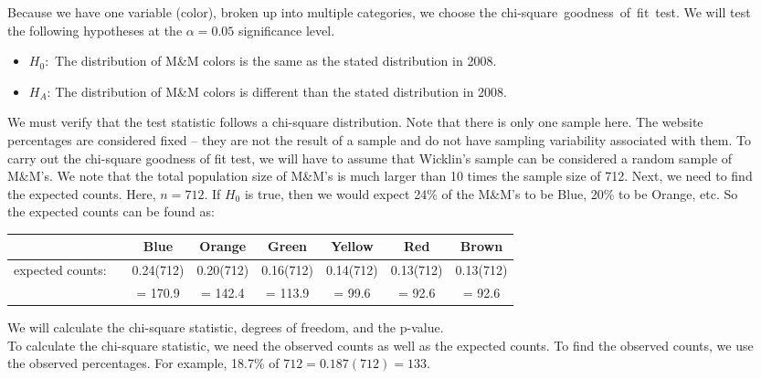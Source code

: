 \begin{examplewrap}
\begin{nexample}
\begin{description}
\item[]  
Because we have one variable (color), broken up into multiple categories, we choose the \mbox{chi-square goodness of fit test.} We will test the following hypotheses at the $\alpha=0.05$ significance level.
\begin{itemize}\vspace{-1mm}
\setlength{\itemsep}{0mm}
\item[] $H_0$:  \,The distribution of M\&M colors is the same as the stated distribution in 2008. 
\item[] $H_A$: The distribution of M\&M colors is different than the stated distribution in 2008.
 \end{itemize}
\item[]  We must verify that the test statistic follows a chi-square distribution.  Note that there is only one sample here.  The website percentages are considered fixed -- they are not the result of a sample and do not have sampling variability associated with them.  To carry out the chi-square goodness of fit test, we will have to assume that Wicklin's sample can be considered a random sample of M\&M's.  We note that the total population size of M\&M's is much larger than 10 times the sample size of 712.  Next, we need to find the expected counts.  Here, $n=712$.  If $H_0$ is true, then we would expect 24\% of the M\&M's to be Blue, 20\% to be Orange, etc.  So the expected counts can be found as:

\begin{small}
\begin{tabular}{ll ccc ccc}
\hline
	 & \hspace{1mm} & Blue & Orange & Green & Yellow & Red & Brown\\
\hline
expected counts:&		& 0.24(712) &  0.20(712) & 0.16(712) & 0.14(712) & 0.13(712) & 0.13(712)  \\
&		& = 170.9 &  = 142.4 & = 113.9 & = 99.6 & = 92.6 & = 92.6\\ 
\hline
\end{tabular}
\end{small}

\item[  ]  We will calculate the chi-square statistic, degrees of freedom, and the p-value.\\
To calculate the chi-square statistic, we need the observed counts as well as the expected counts.  To find the observed counts, we use the observed percentages.  For example, 18.7\% of $712 = 0.187(712)=133$.


\end{description}
\end{nexample}
\end{examplewrap}
